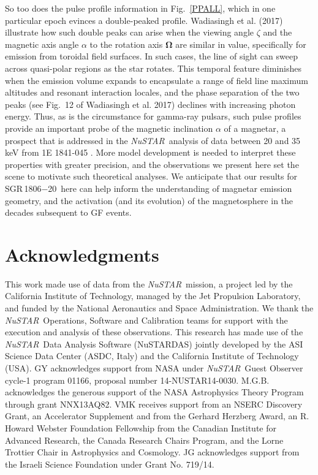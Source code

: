 \documentclass[twocolumn]{aastex6}
\newcommand {\nustar} {\textsl{NuSTAR}}
\def \src {SGR\,1806$-$20}
\begin{document}
So too does the pulse profile information in Fig.~\ref{PPALL}, which in
one particular epoch evinces a double-peaked profile. Wadiasingh et al.
(2017) illustrate how such double peaks can arise when the
viewing angle $\zeta$ and the magnetic axis angle $\alpha$ to the
rotation axis $\boldsymbol{\Omega}$ are similar in value, specifically
for emission from toroidal field surfaces.  In such cases, the line of
sight can sweep across quasi-polar regions as the star rotates.  This
temporal feature diminishes when the emission volume expands to
encapsulate a range of field line maximum altitudes and resonant
interaction locales, and the phase separation of the two peaks (see
Fig.~12 of Wadiasingh et al. 2017) declines with increasing photon
energy. Thus, as is the circumstance for gamma-ray pulsars, such pulse
profiles provide an important probe of the magnetic inclination
$\alpha$ of a magnetar, a prospect that is addressed in the \nustar\
analysis of data between 20 and 35 keV from 1E 1841-045
\citep{an13ApJ:1841,an15ApJ:1841}. More model development is needed to interpret
these properties with greater precision, and the observations we
present here set the scene to motivate such theoretical analyses.  We
anticipate that our results for \src\ here can help inform the
understanding of magnetar emission geometry, and the activation (and
its evolution) of the magnetosphere in the decades subsequent to GF events.

\section*{Acknowledgments}

This work made use of data from the \nustar\ mission, a project led by
the California Institute of Technology, managed by the Jet Propulsion
Laboratory, and funded by the National Aeronautics and Space 
Administration. We thank the \nustar\ Operations, Software and
Calibration teams for support with the execution and analysis of these
observations. This research has made use of the \nustar\ Data Analysis
Software (NuSTARDAS) jointly developed by the ASI Science Data Center
(ASDC, Italy) and the California Institute of Technology (USA). GY
acknowledges support from NASA under \nustar\ Guest Observer cycle-1
program 01166, proposal number 14-NUSTAR14-0030. M.G.B. acknowledges
the generous support of the NASA Astrophysics Theory Program through
grant NNX13AQ82. VMK receives support from an NSERC Discovery Grant,
an Accelerator Supplement and from the Gerhard Herzberg Award, an
R. Howard Webster Foundation Fellowship from the Canadian Institute
for Advanced Research, the Canada Research Chairs Program, and the
Lorne Trottier Chair in Astrophysics and Cosmology. JG acknowledges
support from the Israeli Science Foundation under Grant No. 719/14.
\end{document}
